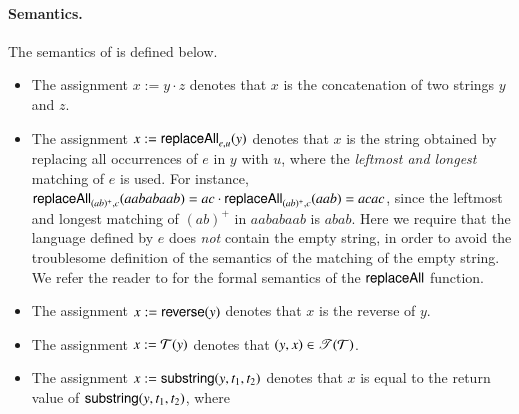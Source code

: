 \paragraph*{Semantics.}
The semantics of {\slint} is 
defined below. 
\begin{itemize}
\item The assignment $x:=y \cdot z$ denotes that $x$ is the concatenation of two strings $y$ and $z$.

\item The assignment $x:=\mathsf{replaceAll}_{e,u}(y)$ denotes that $x$ is the string obtained by replacing all occurrences of $e$ in $y$ with $u$, where the \emph{leftmost and longest} matching of $e$ is used. For instance, $\mathsf{replaceAll}_{(ab)^+,c}(aababaab) =ac \cdot \mathsf{replaceAll}_{(ab)^+,c}(aab)= acac$, since the leftmost and longest matching of $(ab)^+$ in $aababaab$ is $abab$. Here we require that the language defined by $e$ does \emph{not} contain the empty string, in order to avoid the troublesome definition of the semantics of the matching of the empty string. We refer the reader to \cite{CCH+18} for the formal semantics of the $\mathsf{replaceAll}$ function.
%
\item The assignment $x:=\mathsf{reverse}(y)$ denotes that $x$ is the reverse of $y$.
%
\item The assignment $x:=\mathcal{T}(y)$ denotes that $(y,x) \in \mathscr{T}(\mathcal{T})$. %
%
\item The assignment $x:=\mathsf{substring}(y, t_1, t_2)$ denotes that $x$ is equal to the return value of $\mathsf{substring}(y, t_1, t_2)$, where 


\end{itemize}
